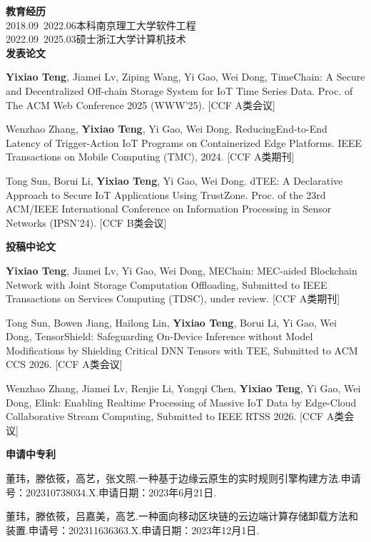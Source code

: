 \cleardoublepage
{}
\noindent\textbf{教育经历}\\
2018.09~2022.06\quad  本科\quad  南京理工大学\quad  软件工程\\
2022.09~2025.03\quad  硕士\quad  浙江大学\quad \quad \quad  计算机技术\\


\noindent\textbf{发表论文}
\begin{enumerate}[label={[\arabic*]},leftmargin=*]
\item \textbf{Yixiao Teng}, Jiamei Lv, Ziping Wang, Yi Gao, Wei Dong, TimeChain: A Secure and Decentralized Off-chain Storage System for IoT Time Series Data. Proc. of The ACM Web Conference 2025 (WWW'25). [CCF A类会议]
\item Wenzhao Zhang, \textbf{Yixiao Teng}, Yi Gao, Wei Dong. ReducingEnd-to-End Latency of Trigger-Action IoT Programs on Containerized Edge Platforms. IEEE Transactions on Mobile Computing (TMC), 2024. [CCF A类期刊]
\item Tong Sun, Borui Li, \textbf{Yixiao Teng}, Yi Gao, Wei Dong. dTEE: A Declarative Approach to Secure IoT Applications Using TrustZone. Proc. of the 23rd ACM/IEEE International Conference on Information Processing in Sensor Networks (IPSN'24). [CCF B类会议]\\
\end{enumerate}

\noindent\textbf{投稿中论文}
\begin{enumerate}[label={[\arabic*]},leftmargin=*]
    \item \textbf{Yixiao Teng}, Jiamei Lv, Yi Gao, Wei Dong, MEChain: MEC-aided Blockchain Network with Joint Storage Computation Offloading, Submitted to IEEE Transactions on Services Computing (TDSC), under review. [CCF A类期刊]
    \item Tong Sun, Bowen Jiang, Hailong Lin, \textbf{Yixiao Teng}, Borui Li, Yi Gao, Wei Dong, TensorShield: Safeguarding On-Device Inference without Model Modifications by Shielding Critical DNN Tensors with TEE, Submitted to ACM CCS 2026. [CCF A类会议]
    \item Wenzhao Zhang, Jiamei Lv, Renjie Li, Yongqi Chen, \textbf{Yixiao Teng}, Yi Gao, Wei Dong, Elink: Enabling Realtime Processing of Massive IoT Data by Edge-Cloud Collaborative Stream Computing, Submitted to IEEE RTSS 2026. [CCF A类会议]\\
\end{enumerate}

\noindent\textbf{申请中专利}
\begin{enumerate}[label={[\arabic*]},leftmargin=*]
    \item 董玮，滕依筱，高艺，张文照.一种基于边缘云原生的实时规则引擎构建方法.申请号：202310738034.X.申请日期：2023年6月21日.
    \item 董玮，滕依筱，吕嘉美，高艺.一种面向移动区块链的云边端计算存储卸载方法和装置.申请号：202311636363.X.申请日期：2023年12月1日.
\end{enumerate}